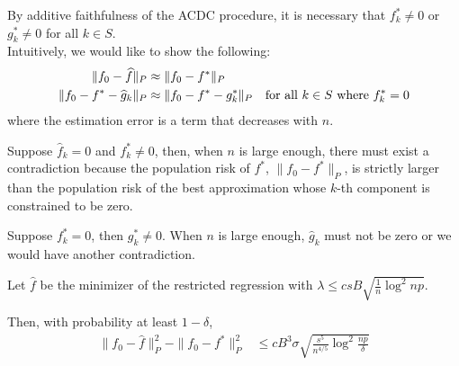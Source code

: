 By additive faithfulness of the ACDC procedure, it is necessary that $f^*_k \neq 0$ or $g^*_k \neq 0$ for all $k \in S$. \\


Intuitively, we would like to show the following:
\begin{align*}
\| f_0 - \widehat{f} \|_P & \approx \| f_0 - f^* \|_P \\
\| f_0 - f^* - \widehat{g}_k \|_P & \approx \| f_0 - f^* - g^*_k \|_P 
       \quad \textrm{for all $k \in S$ where $f^*_k = 0$}
\end{align*}
where the estimation error is a term that decreases with $n$.

Suppose $\hat{f}_k = 0$ and $f^*_k \neq 0$, then, when $n$ is large enough, there must exist a contradiction because the population risk of $f^*$, $\| f_0 - f^* \|_P$, is strictly larger than the population risk of the best approximation whose $k$-th component is constrained to be zero. 

Suppose $f^*_k = 0$, then $g^*_k \neq 0$. When $n$ is large enough, $\hat{g}_k$ must not be zero or we would have another contradiction. \\


\begin{theorem}
\label{thm:convex_consistent}
Let $\hat{f}$ be the minimizer of the restricted regression with $\lambda \leq c sB \sqrt{ \frac{1}{n} \log^2 np}$.

Then, with probability at least $1-\delta$,
\begin{align}
\|f_0 - \hat{f} \|_P^2 - \| f_0 - f^* \|_P^2 
&\leq c B^3\sigma \sqrt{ \frac{s^5}{n^{4/5}} \log^2 \frac{np}{\delta}}
\end{align}

\end{theorem}



